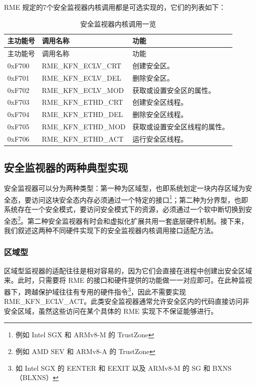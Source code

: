 RME 规定的7个安全监视器内核调用都是可选实现的，它们的列表如下：

\begin{xltabular}{\textwidth}{@{}>{\hsize\raggedright\arraybackslash}X>{\hsize\raggedright\arraybackslash}X>{\hsize\raggedright\arraybackslash}X@{}}
\caption{安全监视器内核调用一览}\label{tab:8-93-security-monitor-kernel-calls}\\
\toprule
主功能号 & 调用名称 & 功能\tabularnewline
\endfirsthead
\toprule
主功能号 & 调用名称 & 功能\tabularnewline
\midrule
\endhead
\bottomrule
\endlastfoot
0xF700 & RME\_KFN\_ECLV\_CRT & 创建安全区。\tabularnewline
0xF701 & RME\_KFN\_ECLV\_DEL & 删除安全区。\tabularnewline
0xF702 & RME\_KFN\_ECLV\_MOD & 获取或设置安全区的属性。\tabularnewline
0xF703 & RME\_KFN\_ETHD\_CRT & 创建安全区线程。\tabularnewline
0xF704 & RME\_KFN\_ETHD\_DEL & 删除安全区线程。\tabularnewline
0xF705 & RME\_KFN\_ETHD\_MOD &
获取或设置安全区线程的属性。\tabularnewline
0xF706 & RME\_KFN\_ETHD\_ACT & 运行安全区线程。\tabularnewline
\end{xltabular}

\subsection{安全监视器的两种典型实现}\label{subsec:8-two-typical-security-monitor-implementations}

安全监视器可以分为两种类型：第一种为区域型，也即系统划定一块内存区域为安全态，要访问这块安全态内存必须通过一个特定的接口\footnote{例如 Intel SGX 和 ARMv8-M 的 TrustZone}；第二种为分界型，也即系统存在一个安全模式，要访问安全模式下的资源，必须通过一个软中断切换到安全态\footnote{例如 AMD SEV 和 ARMv8-A 的 TrustZone}。第二种安全监视器有时会和虚拟化扩展共用一套底层硬件机制。接下来，我们叙述这两种不同硬件实现下的安全监视器内核调用接口适配方法。

\subsubsection{区域型}\label{subsubsec:8-region-type}

区域型监视器的适配往往是相对容易的，因为它们会直接在进程中创建出安全区域来。此时，只需要将 RME 的接口和硬件提供的功能做一一对应即可。在此种监视器下，跨越保护域往往有专用的硬件指令\footnote{如 Intel SGX 的 EENTER 和 EEXIT 以及 ARMv8-M 的 SG 和 BXNS（BLXNS）}，因此不需要实现 RME\_KFN\_ECLV\_ACT。此类安全监视器通常允许安全区内的代码直接访问非安全区域，虽然这些访问在某个具体的 RME 实现下不保证能够进行。

